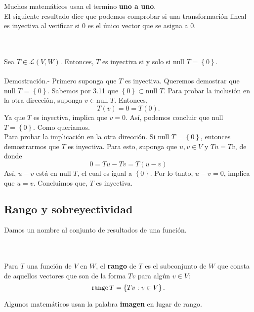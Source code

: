 Muchos matemáticos usan el termino \textbf{uno a uno}.\\

El siguiente resultado dice que podemos comprobar si una transformación lineal es inyectiva al verificar si $0$ es el único vector que se asigna a $0$.

\begin{myteo}\,\\\\
    Sea $T\in \mathcal{L}(V,W)$. Entonces, $T$ es inyectiva si y solo si null $T=\left\{0\right\}$.\\\\
	Demostración.-\; Primero suponga que $T$ es inyectiva. Queremos demostrar que null $T$ = $\left\{0\right\}$. Sabemos por 3.11 que $\left\{0\right\}\subset \mbox{null }T$. Para probar la inclusión en la otra dirección, suponga $v\in \mbox{null }T$. Entonces,
	$$T(v)=0=T(0).$$
	Ya que $T$ es inyectiva, implica que $v=0$. Así, podemos concluir que null $T=\left\{0\right\}$. Como queriamos.\\

	Para probar la implicación en la otra dirección. Si null $T=\left\{0\right\}$, entonces demostrarmos que $T$ es inyectiva. Para esto, suponga que $u,v\in V$ y $Tu=Tv$, de donde
	$$0=Tu-Tv=T(u-v)$$
	Así, $u-v$ está en null $T$, el cual es igual a $\left\{0\right\}$. Por lo tanto, $u-v=0$, implica que $u=v$. Concluimos que, $T$ es inyectiva.
\end{myteo}
\vspace{.5cm}

\subsection*{Rango y sobreyectividad}

Damos un nombre al conjunto de resultados de una función.

\begin{mydef}[Rango]\,\\\\
    Para $T$ una función de $V$ en $W$, el \textbf{rango} de $T$ es el subconjunto de $W$ que consta de aquellos vectores que son de la forma $Tv$ para algún $v\in V$:
$$\operatorname{range} T=\left\{Tv:v\in V\right\}.$$
\end{mydef}

Algunos matemáticos usan la palabra \textbf{imagen} en lugar de rango.\\

